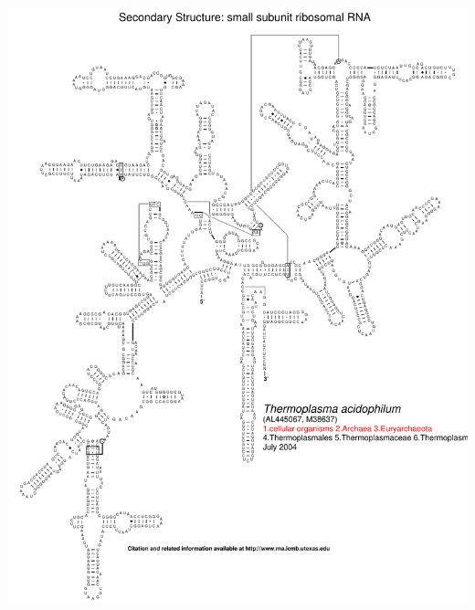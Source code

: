 \documentclass[landscape]{slides}
\begin{document}
\begin{slide}\begin{center}\includegraphics[height=8in]{figs/arc-23}\end{center}\vfill\end{slide}
\end{document}
